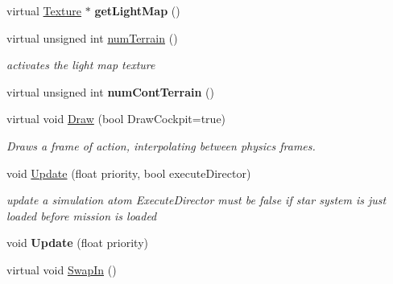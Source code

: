 \begin{DoxyCompactItemize}
\item 
virtual \hyperlink{classTexture}{Texture} $\ast$ {\bfseries get\+Light\+Map} ()\hypertarget{classStarSystem_a7821ba00a501003462e74d7174a0e761}{}\label{classStarSystem_a7821ba00a501003462e74d7174a0e761}

\item 
virtual unsigned int \hyperlink{classStarSystem_aa0fd84c272a59afaee4d7d39a5c9c469}{num\+Terrain} ()\hypertarget{classStarSystem_aa0fd84c272a59afaee4d7d39a5c9c469}{}\label{classStarSystem_aa0fd84c272a59afaee4d7d39a5c9c469}

\begin{DoxyCompactList}\small\item\em activates the light map texture \end{DoxyCompactList}\item 
virtual unsigned int {\bfseries num\+Cont\+Terrain} ()\hypertarget{classStarSystem_a810cc88f9ea8b11a10ffb24777e439c0}{}\label{classStarSystem_a810cc88f9ea8b11a10ffb24777e439c0}

\item 
virtual void \hyperlink{classStarSystem_abae8700eaf960b3b1750f5c67b3999eb}{Draw} (bool Draw\+Cockpit=true)\hypertarget{classStarSystem_abae8700eaf960b3b1750f5c67b3999eb}{}\label{classStarSystem_abae8700eaf960b3b1750f5c67b3999eb}

\begin{DoxyCompactList}\small\item\em Draws a frame of action, interpolating between physics frames. \end{DoxyCompactList}\item 
void \hyperlink{classStarSystem_a761562b9400fa14e0442557eb5d6e64e}{Update} (float priority, bool execute\+Director)
\begin{DoxyCompactList}\small\item\em update a simulation atom Execute\+Director must be false if star system is just loaded before mission is loaded \end{DoxyCompactList}\item 
void {\bfseries Update} (float priority)\hypertarget{classStarSystem_a44e2f03aa3109c183cb3ab569855876a}{}\label{classStarSystem_a44e2f03aa3109c183cb3ab569855876a}

\item 
virtual void \hyperlink{classStarSystem_a87a83c6a03fafbe32510d6020d3ad0b7}{Swap\+In} ()\hypertarget{classStarSystem_a87a83c6a03fafbe32510d6020d3ad0b7}{}\label{classStarSystem_a87a83c6a03fafbe32510d6020d3ad0b7}


\end{DoxyCompactItemize}
